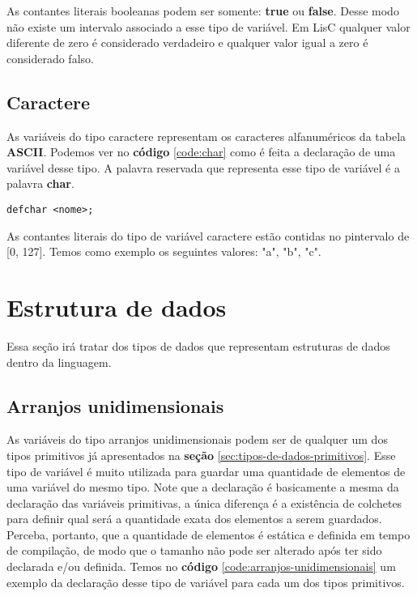 \documentclass[
  12pt,				%
  oneside,			%
  a4paper,			%
  english,			%
  french,				%
  spanish,			%
  brazil,				%
]{abntex2}
\begin{document}
As contantes literais booleanas podem ser somente: \textbf{true} ou
\textbf{false}. Desse modo não existe um intervalo associado a esse
tipo de variável. Em LisC qualquer valor diferente de zero é
considerado verdadeiro e qualquer valor igual a zero é considerado
falso.

\subsection{Caractere}
\label{subsec:caractere}

As variáveis do tipo caractere representam os caracteres
alfanuméricos da tabela \textbf{ASCII}. Podemos ver no \textbf{código}
\ref{code:char} como é feita a declaração de uma variável desse
tipo. A palavra reservada que representa esse tipo de variável é a palavra \textbf{char}.

\begin{lstlisting}[label=code:char,caption=Declaração de uma variável caractere]
  defchar <nome>;
\end{lstlisting}

As contantes literais do tipo de variável caractere estão contidas no
pintervalo de [0, 127]. Temos como exemplo os seguintes valores: "a",
"b", "c".

\section{Estrutura de dados}
\label{sec:estrutura-de-dados}

Essa seção irá tratar dos tipos de dados que representam estruturas de
dados dentro da linguagem.

\subsection{Arranjos unidimensionais}
\label{subsec:arranjos-unidimensionais}

As variáveis do tipo arranjos unidimensionais podem ser de qualquer um
dos tipos primitivos já apresentados na \textbf{seção}
\ref{sec:tipos-de-dados-primitivos}. Esse tipo de variável é muito
utilizada para guardar uma quantidade de elementos de uma variável do mesmo
tipo. Note que a declaração é basicamente a mesma da declaração das
variáveis primitivas, a única diferença é a existência de colchetes
para definir qual será a quantidade exata dos elementos a serem
guardados. Perceba, portanto, que a quantidade de elementos é estática
e definida em tempo de compilação, de modo que o tamanho não pode ser
alterado após ter sido declarada e/ou definida. Temos no
\textbf{código} \ref{code:arranjos-unidimensionais} um exemplo da
declaração desse tipo de variável para cada um dos tipos primitivos.
\end{document}

